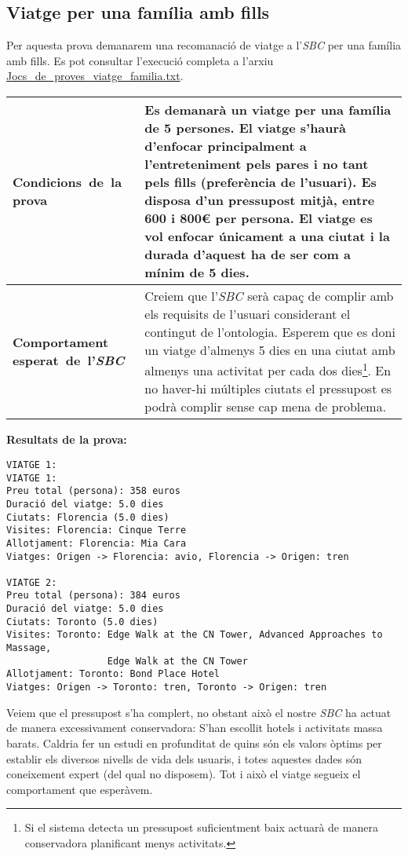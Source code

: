\documentclass[11pt,a4paper]{article}
\begin{document}
\subsection{Viatge per una família amb fills}
Per aquesta prova demanarem una recomanació de viatge a l'\emph{SBC} per una família amb fills. Es pot consultar l'execució completa a l'arxiu \url{Jocs_de_proves_viatge_familia.txt}. \\

\noindent
\begin{tabular}{|p{}|p{}|}
\hline
\textbf{\mbox{Condicions de la} \mbox{prova}} & Es demanarà un viatge per una família de 5 persones. El viatge s'haurà d'enfocar principalment a l'entreteniment pels pares i no tant pels fills (preferència de l'usuari). Es disposa d'un pressupost mitjà, entre 600 i 800\euro{} per persona. El viatge es vol enfocar únicament a una ciutat i la durada d'aquest ha de ser com a mínim de 5 dies. \\
\hline
\textbf{Comportament \mbox{esperat de l'\emph{SBC}}} & Creiem que l'\emph{SBC} serà capaç de complir amb els requisits de l'usuari considerant el contingut de l'ontologia. Esperem que es doni un viatge d'almenys 5 dies en una ciutat amb almenys una activitat per cada dos dies\footnote{Si el sistema detecta un pressupost suficientment baix actuarà de manera conservadora planificant menys activitats.}. En no haver-hi múltiples ciutats el pressupost es podrà complir sense cap mena de problema. \\
\hline
\end{tabular}
\bigskip

\textbf{Resultats de la prova:}
\begin{lstlisting}VIATGE 1:
VIATGE 1:
Preu total (persona): 358 euros
Duració del viatge: 5.0 dies
Ciutats: Florencia (5.0 dies)
Visites: Florencia: Cinque Terre
Allotjament: Florencia: Mia Cara
Viatges: Origen -> Florencia: avio, Florencia -> Origen: tren

VIATGE 2:
Preu total (persona): 384 euros
Duració del viatge: 5.0 dies
Ciutats: Toronto (5.0 dies)
Visites: Toronto: Edge Walk at the CN Tower, Advanced Approaches to Massage, 
                  Edge Walk at the CN Tower
Allotjament: Toronto: Bond Place Hotel
Viatges: Origen -> Toronto: tren, Toronto -> Origen: tren
\end{lstlisting} 


Veiem que el pressupost s'ha complert, no obstant això el nostre \emph{SBC} ha actuat de manera excessivament conservadora: S'han escollit hotels i activitats massa barats. Caldria fer un estudi en profunditat de quins són els valors òptims per establir els diversos nivells de vida dels usuaris, i totes aquestes dades són coneixement expert (del qual no disposem). Tot i això el viatge segueix el comportament que esperàvem.
\end{document}
